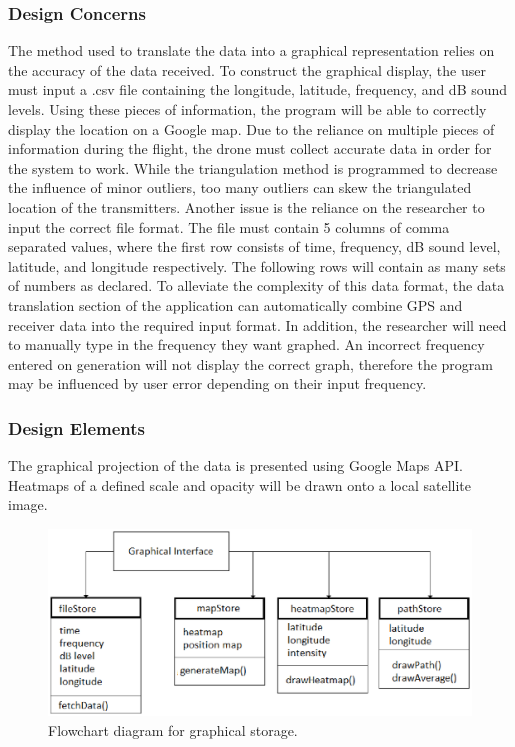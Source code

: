 \documentclass[onecolumn, draftclsnofoot,10pt, compsoc]{IEEEtran}
\begin{document}
\subsubsection{Design Concerns}
The method used to translate the data into a graphical representation relies on the accuracy of the data received.
To construct the graphical display, the user must input a .csv file containing the longitude, latitude, frequency, and dB sound levels. Using these pieces of information, the program will be able to correctly display the location on a Google map. Due to the reliance on multiple pieces of information during the flight, the drone must collect accurate data in order for the system to work.
While the triangulation method is programmed to decrease the influence of minor outliers, too many outliers can skew the triangulated location of the transmitters.
Another issue is the reliance on the researcher to input the correct file format. The file must contain 5 columns of comma separated values, where the first row consists of time, frequency, dB sound level, latitude, and longitude respectively. The following rows will contain as many sets of numbers as declared. To alleviate the complexity of this data format, the data translation section of the application can automatically combine GPS and receiver data into the required input format.
In addition, the researcher will need to manually type in the frequency they want graphed. An incorrect frequency entered on generation will not display the correct graph, therefore the program may be influenced by user error depending on their input frequency.
\subsubsection{Design Elements}
The graphical projection of the data is presented using Google Maps API.
Heatmaps of a defined scale and opacity will be drawn onto a local satellite image. 

\begin{figure}[h]
\includegraphics[width=7in]{GraphicsFlowchart.eps}
\captionsetup{justification=centering}
\caption{Flowchart diagram for graphical storage.}
\centering
\end{figure}
\end{document}
